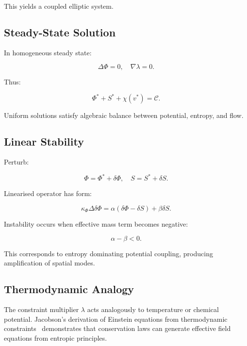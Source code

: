\documentclass[12pt,a4paper]{article}
\theoremstyle{definition}
\begin{document}
This yields a coupled elliptic system.

\subsection{Steady-State Solution}

In homogeneous steady state:

\begin{equation}
  \Delta \Phi = 0,
  \quad
  \nabla \lambda = 0.
\end{equation}

Thus:

\begin{equation}
  \Phi^* + S^* + \chi(v^*) = \mathcal{C}.
\end{equation}

Uniform solutions satisfy algebraic balance between
potential, entropy, and flow.

\subsection{Linear Stability}

Perturb:

\begin{equation}
  \Phi = \Phi^* + \delta \Phi,
  \quad
  S = S^* + \delta S.
\end{equation}

Linearised operator has form:

\begin{equation}
  \kappa_\Phi \Delta \delta \Phi
  =
  \alpha (\delta \Phi - \delta S)
  + \beta \delta S.
\end{equation}

Instability occurs when effective mass term becomes negative:

\begin{equation}
  \alpha - \beta < 0.
\end{equation}

This corresponds to entropy dominating potential coupling,
producing amplification of spatial modes.

\subsection{Thermodynamic Analogy}

The constraint multiplier $\lambda$
acts analogously to temperature or chemical potential.
Jacobson’s derivation of Einstein equations from
thermodynamic constraints~\citep{jacobson1995}
demonstrates that conservation laws can generate
effective field equations from entropic principles.
\end{document}
